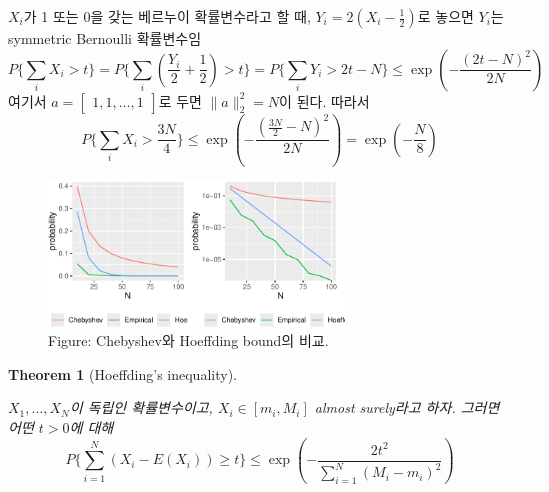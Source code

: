 \documentclass[
  letterpaper,
  DIV=11,
  numbers=noendperiod]{scrreprt}
\theoremstyle{plain}
\newtheorem{theorem}{Theorem}[chapter]
\theoremstyle{definition}
\theoremstyle{definition}
\theoremstyle{plain}
\theoremstyle{plain}
\theoremstyle{remark}
\begin{document}
\(X_i\)가 1 또는 0을 갖는 베르누이 확률변수라고 할 때,
\(Y_i = 2(X_i - \frac{1}{2})\)로 놓으면 \(Y_i\)는 symmetric Bernoulli
확률변수임 \[
P\{ \sum_i X_i > t\} = P \{ \sum_i (\frac{Y_i}{2}+ \frac{1}{2}) > t \} = P\{\sum_i Y_i > 2t - N \} \leq \exp (-\frac{(2t-N)^2}{2N})
\] 여기서 \(a=\begin{bmatrix} 1,1,\ldots, 1 \end{bmatrix}\)로 두면
\(\|a\|_2^2=N\)이 된다. 따라서 \[
P\{\sum_i X_i > \frac{3N}{4} \}\leq \exp (- \frac{(\frac{3N}{2}-N)^2}{2N}) = \exp (-\frac{N}{8})
\]

\begin{figure}[H]

{\centering \includegraphics[width=0.7\textwidth,height=\textheight]{ineq_files/figure-pdf/unnamed-chunk-4-1.pdf}

}

\caption{Figure: Chebyshev와 Hoeffding bound의 비교.}

\end{figure}%

\begin{theorem}[Hoeffding's
inequality]\protect\hypertarget{thm-hoeffdingineq}{}\label{thm-hoeffdingineq}

\(X_1, \ldots, X_N\)이 독립인 확률변수이고, \(X_i \in [m_i, M_i]\)
almost surely라고 하자. 그러면 어떤 \(t>0\)에 대해 \[
P \{\sum_{i=1}^N (X_i - E(X_i))\geq t \} \leq \exp (- \frac{2t^2}{\sum_{i=1}^N (M_i - m_i)^2})
\]

\end{theorem}
\end{document}

